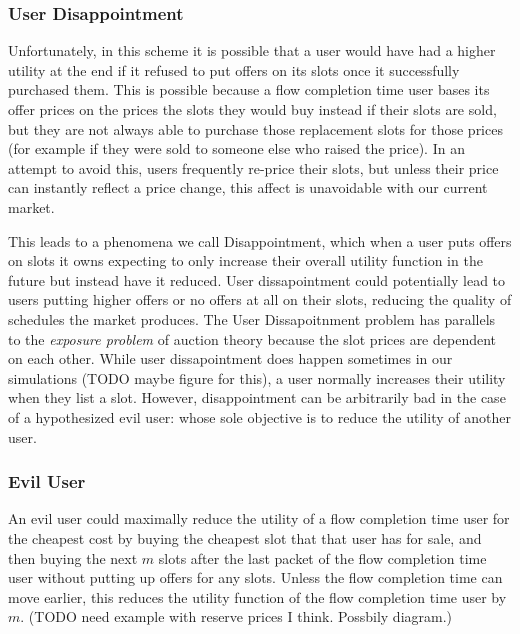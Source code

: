 \subsubsection{User Disappointment}
Unfortunately, in this scheme it is possible that a user would have had a higher utility at the end if it refused to put offers on its slots once it successfully purchased them.
This is possible because a flow completion time user bases its offer prices on the prices the slots they would buy instead if their slots are sold, but they are not always able to purchase those replacement slots for those prices (for example if they were sold to someone else who raised the price). In an attempt to avoid this, users frequently re-price their slots, but unless their price can instantly reflect a price change, this affect is unavoidable with our current market.

This leads to a phenomena we call Disappointment, which when a user puts offers on slots it owns expecting to only increase their overall utility function in the future but instead have it reduced. User dissapointment could potentially lead to users putting higher offers or no offers at all on their slots, reducing the quality of schedules the market produces.
The User Dissapoitnment problem has parallels to the \emph{exposure problem} of auction theory \cite{milgrom00, englmaier06} because the slot prices are dependent on each other.
While user dissapointment does happen sometimes in our simulations (TODO maybe figure for this), a user normally increases their utility when they list a slot.
However, disappointment can be arbitrarily bad in the case of a hypothesized evil user: whose sole objective is to reduce the utility of another user.
\subsubsection{Evil User}
An evil user could maximally reduce the utility of a flow completion time user for the cheapest cost by buying the cheapest slot that that user has for sale, and then buying the next $m$ slots after the last packet of the flow completion time user without putting up offers for any slots. Unless the flow completion time can move earlier, this reduces the utility function of the flow completion time user by $m$. (TODO need example with reserve prices I think. Possbily diagram.)

